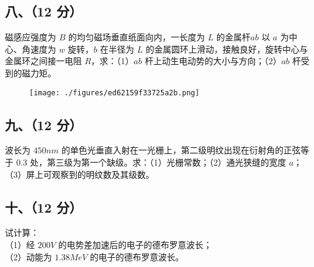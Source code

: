 \subsection{八、（12 分）}
磁感应强度为 $B$ 的均匀磁场垂直纸面向内，一长度为 $L$ 的金属杆$ab$ 以 $a$ 为中心、角速度为 $w$ 旋转，$b$ 在半径为 $L$ 的金属圆环上滑动，接触良好，旋转中心与金属环之间接一电阻 $R$，求：（1）$ab$ 杆上动生电动势的大小与方向；（2）$ab$ 杆受到的磁力矩。
\begin{figure}[ht]
\centering
\texttt{[image: ./figures/ed62159f33725a2b.png]}
\caption{} \label{fig_NJU05_3}
\end{figure}
\subsection{九、（12 分）}
波长为 $450nm$ 的单色光垂直入射在一光栅上，第二级明纹出现在衍射角的正弦等于 0.3 处，第三级为第一个缺级。求：（1）光栅常数；（2）通光狭缝的宽度 $a$；（3）屏上可观察到的明纹数及其级数。
\subsection{十、（12 分）}
试计算：\\
（1）经 $200V$ 的电势差加速后的电子的德布罗意波长；\\
（2）动能为 $1.38MeV$ 的电子的德布罗意波长。